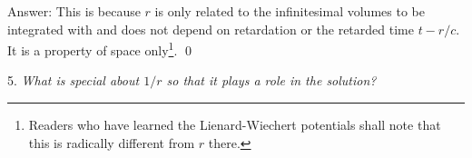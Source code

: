 \documentclass[11pt]{article}              %
\begin{document}
Answer: This is because $r$ is only related to the infinitesimal volumes to be integrated with and does not depend on retardation or the retarded time $t-r/c$. It is a property of space only\footnote{Readers who have learned the Lienard-Wiechert potentials shall note that this is radically different from $r$ there.}.
\qed



5. {\it What is special about ${\mathit 1}/r$ so that it plays a role in the solution?} 
\end{document}
